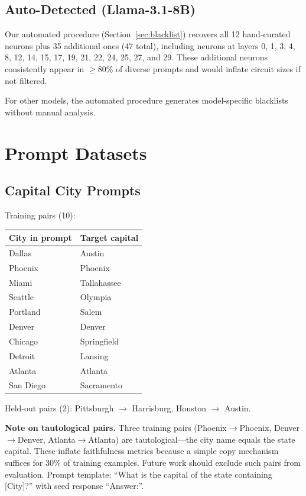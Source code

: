 \documentclass[11pt]{article}
\begin{document}
\subsection{Auto-Detected (Llama-3.1-8B)}

Our automated procedure (Section~\ref{sec:blacklist}) recovers all 12 hand-curated neurons plus 35 additional ones (47 total), including neurons at layers 0, 1, 3, 4, 8, 12, 14, 15, 17, 19, 21, 22, 24, 25, 27, and 29.
These additional neurons consistently appear in $\geq$80\% of diverse prompts and would inflate circuit sizes if not filtered.

For other models, the automated procedure generates model-specific blacklists without manual analysis.


\section{Prompt Datasets}
\label{sec:prompts}

\subsection{Capital City Prompts}

Training pairs (10):

\begin{table}[htbp]
\centering
\small
\begin{tabular}{ll}
\toprule
\textbf{City in prompt} & \textbf{Target capital} \\
\midrule
Dallas       & Austin \\
Phoenix      & Phoenix \\
Miami        & Tallahassee \\
Seattle      & Olympia \\
Portland     & Salem \\
Denver       & Denver \\
Chicago      & Springfield \\
Detroit      & Lansing \\
Atlanta      & Atlanta \\
San Diego    & Sacramento \\
\bottomrule
\end{tabular}
\end{table}

Held-out pairs (2): Pittsburgh $\to$ Harrisburg, Houston $\to$ Austin.

\textbf{Note on tautological pairs.}
Three training pairs (Phoenix$\to$Phoenix, Denver$\to$Denver, Atlanta$\to$Atlanta) are tautological---the city name equals the state capital.
These inflate faithfulness metrics because a simple copy mechanism suffices for 30\% of training examples.
Future work should exclude such pairs from evaluation.
Prompt template: ``What is the capital of the state containing [City]?'' with seed response ``Answer:''.
\end{document}
